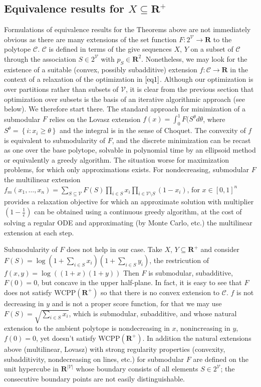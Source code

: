 \documentclass{article}
\theoremstyle{case}
\begin{document}
\subsection{Equivalence results for $X \subseteq \mathbf{R}^+$}
Formulations of equivalence results for the Theorems above are not immediately obvious as there are many extensions of the set function $F\colon 2^{\mathcal{V}} \to \mathbf{R}$ to the polytope $\mathcal{C}$. $\mathcal{C}$ is defined in terms of the give sequences $X$, $Y$ on a subset of $\mathcal{C}$ through the association $S \in 2^{\mathcal{V}}$ with $p_S \in \mathbf{R}^2$. Nonetheless, we may look for the existence of a suitable (convex, possibly subadditive) extension $f\colon \mathcal{C} \to \mathbf{R}$ in the context of a relaxation of the optimization in $\ref{eq1}$. Although our optimization is over partitions rather than subsets of $\mathcal{V}$, it is clear from the previous section that optimization over subsets is the basis of an iterative algorithmic approach (see below). We therefore start there. The standard approach for minimization of a submodular $F$ relies on the Lovasz extension $f(x) = \int_0^1 F(S^{\theta}d\theta$, where $S^{\theta} = \left\lbrace i \colon x_i \geq \theta \right\rbrace$ and the integral is in the sense of Choquet. The convexity of $f$ is equivalent to submodularity of $F$, and the discrete minimization can be recast as one over the base polytope, solvable in polynomial time by an ellipsoid method or equivalently a greedy algorithm. The situation worse for maximization problems, for which only approximations exists. For nondecreasing, submodular $F$ the multilinear extension $f_m(x_1, \dots, x_n) = \sum_{S \subseteq \mathcal{V}} F(S)\prod_{i \in S}x_i \prod_{i \in \mathcal{V} \setminus S}(1 - x_i)$, for $x \in \left[ 0,1\right]^n$ provides a relaxation objective for which an approximate solution with multiplier $(1 - \frac{1}{\epsilon})$ can be obtained using a continuous greedy algorithm, at the cost of solving a regular ODE and approximating (by Monte Carlo, etc.) the multilinear extension at each step.

Submodularity of $F$ does not help in our case. Take $X$, $Y \subseteq \mathbf{R}^+$ and consider $F(S) = \log{(1 + \sum_{i \in S} x_i)(1 + \sum_{i \in S}y_i)}$, the restricution of $f(x,y) = \log{((1+x)(1+y))}$ Then $F$ is submodular, subadditive, $F(0) = 0$, but concave in the upper half-plane. In fact, it is easy to see that $F$ does not satisfy WCPP$(\mathbf{R}^+)$ so that there is no convex extension to $\mathcal{C}$. $f$ is not decreasing in $y$ and is not a proper score function, for that we may use $F(S) = \sqrt{\sum_{i \in S}x_i}$, which is submodular, subadditive, and whose natural extension to the ambient polytope is nondecreasing in $x$, nonincreasing in $y$, $f(0) = 0$, yet doesn't satisfy WCPP$(\mathbf{R}^+)$. In addition the natural extensions above (multilinear, Lovasz) with strong regularity properties (convexity, subadditivity, nondecreasing on lines, etc.) for submodular $F$ are defined on the unit hypercube in $\mathbf{R}^{\vert \mathcal{V}\vert}$ whose boundary consists of all elements $S \in 2^{\mathcal{V}}$; the consecutive boundary points are not easily distinguishable.
\end{document}
